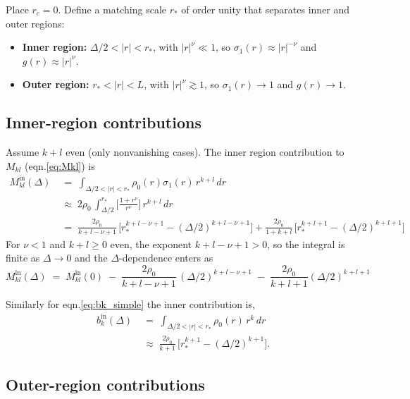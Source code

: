 \documentclass[11pt,a4paper]{article}
\theoremstyle{remark}
\begin{document}
\begin{onehalfspace}
Place $r_c = 0$. Define a matching scale $r_*$ of order unity that separates inner and outer regions:
\begin{itemize}
  \item \textbf{Inner region:} $\Delta/2 < |r| < r_*$, with $|r|^\nu \ll 1$, so $\sigma_1(r) \approx |r|^{-\nu}$ and $g(r) \approx |r|^\nu$.
  \item \textbf{Outer region:} $r_* < |r| < L$, with $|r|^\nu \gtrsim 1$, so $\sigma_1(r) \to 1$ and $g(r) \to 1$.
\end{itemize}

\subsection{Inner-region contributions}

Assume $k + l$ even (only nonvanishing cases). The inner region contribution to $M_{kl}$ (eqn.\ref{eq:Mkl}) is
\begin{align}
M_{kl}^{\text{in}}(\Delta) &\;=\; \int_{\Delta/2 < |r| < r_*} \rho_0(r) \sigma_1(r)\, r^{k+l}\, dr \nonumber\\
&\;\approx\; 2 \rho_0\, \int_{\Delta/2}^{r_*} \Big[\frac{1 + r^{\nu}}{r^{\nu}}\Big]\, r^{k+l}\, dr \nonumber\\
&\;=\; \frac{2\rho_0}{k+l - \nu + 1}\,\Big[r_*^{k+l-\nu+1} - (\Delta/2)^{k+l-\nu+1}\Big] + \frac{2\rho_0}{1+k+l}\,\Big[ r_*^{k+l+1} - (\Delta/2)^{k+l+1}\Big]
\label{eq:Mkl_inner}
\end{align}
For $\nu < 1$ and $k + l \geq 0$ even, the exponent $k+l - \nu + 1 > 0$, so the integral is finite as $\Delta \to 0$ and the $\Delta$-dependence enters as
\begin{equation}
M_{kl}^{\text{in}}(\Delta) \;=\; M_{kl}^{\text{in}}(0) \;-\; \frac{2\rho_0}{k+l-\nu+1}\,(\Delta/2)^{k+l-\nu+1} \;-\; \frac{2\rho_0}{k+l+1}(\Delta/2)^{k+l+1}
\label{eq:Mkl_corr}
\end{equation}

Similarly for eqn.\ref{eq:bk_simple} the inner contribution is,
\begin{align}
b_k^{\text{in}}(\Delta) &\;=\; \int_{\Delta/2 < |r| < r_*} \rho_0(r)\, r^k\, dr \nonumber\\
&\;\approx\; \frac{2\rho_0}{k+1}\,\Big[r_*^{k+1} - (\Delta/2)^{k+1}\Big].
\label{eq:bk_inner}
\end{align}

\subsection{Outer-region contributions}


\end{onehalfspace}
\end{document}
